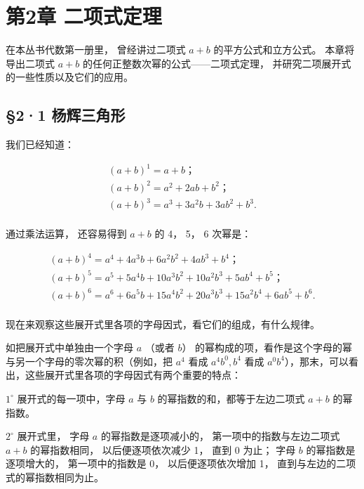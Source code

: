 \chapter{第2章 二项式定理}

在本丛书代数第一册里， 曾经讲过二项式 \(a + b\) 的平方公式和立方公式。
本章将导出二项式 \(a + b\) 的任何正整数次幂的公式------二项式定理，
并研究二项展开式的一些性质以及它们的应用。

\section{§2·1 杨辉三角形}

我们已经知道：

\[
\begin{array}{l} (a + b) ^ {1} = a + b\text{；} \\ (a + b) ^ {2} = a ^ {2} + 2 a b + b ^ {2}\text{；} \\ (a + b) ^ {3} = a ^ {3} + 3 a ^ {2} b + 3 a b ^ {2} + b ^ {3}. \\ \end{array}
\]

通过乘法运算， 还容易得到 \(a + b\) 的 4， 5， 6 次幂是：

\[
\begin{array}{l} (a + b) ^ {4} = a ^ {4} + 4 a ^ {3} b + 6 a ^ {2} b ^ {2} + 4 a b ^ {3} + b ^ {4}\text{；} \\ (a + b) ^ {5} = a ^ {5} + 5 a ^ {4} b + 10 a ^ {3} b ^ {2} + 10 a ^ {2} b ^ {3} + 5 a b ^ {4} + b ^ {5}\text{；} \\ (a + b) ^ {6} = a ^ {6} + 6 a ^ {5} b + 15 a ^ {4} b ^ {2} + 20 a ^ {3} b ^ {3} + 15 a ^ {2} b ^ {4} + 6 a b ^ {5} + b ^ {6}. \\ \end{array}
\]

现在来观察这些展开式里各项的字母因式，看它们的组成，有什么规律。

如把展开式中单独由一个字母 \(a\) （或者 \(b\)）
的幂构成的项，看作是这个字母的幂与另一个字母的零次幂的积（例如，把
\(a^4\) 看成 \(a^4 b^0, b^4\) 看成
\(a^0 b^4\)），那末，可以看出，这些展开式里各项的字母因式有两个重要的特点：

\(1^{\circ}\) 展开式的每一项中，字母 \(a\) 与 \(b\)
的幂指数的和，都等于左边二项式 \(a + b\) 的幂指数。

\(2^{\circ}\) 展开式里， 字母 \(a\) 的幂指数是逐项减小的，
第一项中的指数与左边二项式 \(a + b\) 的幂指数相同， 以后便逐项依次减少
1， 直到 0 为止； 字母 \(b\) 的幂指数是逐项增大的， 第一项中的指数是 0，
以后便逐项依次增加 1， 直到与左边的二项式的幂指数相同为止。


